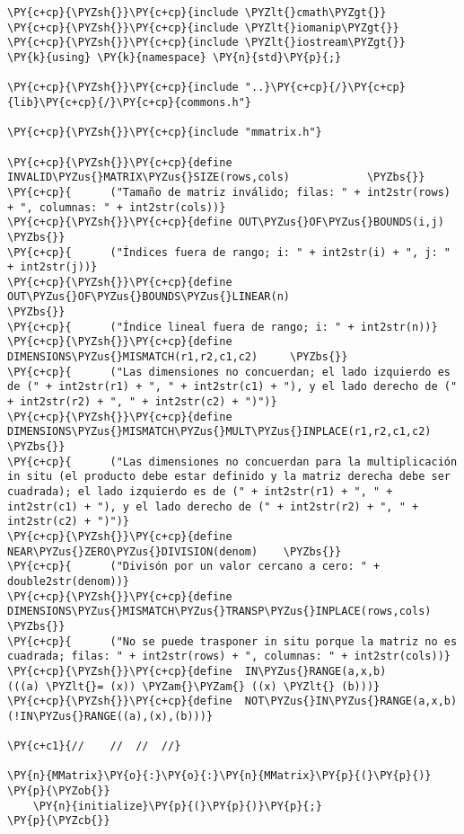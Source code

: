 \begin{Verbatim}[commandchars=\\\{\}]
\PY{c+cp}{\PYZsh{}}\PY{c+cp}{include \PYZlt{}cmath\PYZgt{}}
\PY{c+cp}{\PYZsh{}}\PY{c+cp}{include \PYZlt{}iomanip\PYZgt{}}
\PY{c+cp}{\PYZsh{}}\PY{c+cp}{include \PYZlt{}iostream\PYZgt{}}
\PY{k}{using} \PY{k}{namespace} \PY{n}{std}\PY{p}{;}

\PY{c+cp}{\PYZsh{}}\PY{c+cp}{include "..}\PY{c+cp}{/}\PY{c+cp}{lib}\PY{c+cp}{/}\PY{c+cp}{commons.h"}

\PY{c+cp}{\PYZsh{}}\PY{c+cp}{include "mmatrix.h"}

\PY{c+cp}{\PYZsh{}}\PY{c+cp}{define INVALID\PYZus{}MATRIX\PYZus{}SIZE(rows,cols)			\PYZbs{}}
\PY{c+cp}{		("Tamaño de matriz inválido; filas: " + int2str(rows) + ", columnas: " + int2str(cols))}
\PY{c+cp}{\PYZsh{}}\PY{c+cp}{define OUT\PYZus{}OF\PYZus{}BOUNDS(i,j)						\PYZbs{}}
\PY{c+cp}{		("Índices fuera de rango; i: " + int2str(i) + ", j: " + int2str(j))}
\PY{c+cp}{\PYZsh{}}\PY{c+cp}{define OUT\PYZus{}OF\PYZus{}BOUNDS\PYZus{}LINEAR(n)					\PYZbs{}}
\PY{c+cp}{		("Índice lineal fuera de rango; i: " + int2str(n))}
\PY{c+cp}{\PYZsh{}}\PY{c+cp}{define DIMENSIONS\PYZus{}MISMATCH(r1,r2,c1,c2)		\PYZbs{}}
\PY{c+cp}{		("Las dimensiones no concuerdan; el lado izquierdo es de (" + int2str(r1) + ", " + int2str(c1) + "), y el lado derecho de (" + int2str(r2) + ", " + int2str(c2) + ")")}
\PY{c+cp}{\PYZsh{}}\PY{c+cp}{define	 DIMENSIONS\PYZus{}MISMATCH\PYZus{}MULT\PYZus{}INPLACE(r1,r2,c1,c2)	\PYZbs{}}
\PY{c+cp}{		("Las dimensiones no concuerdan para la multiplicación in situ (el producto debe estar definido y la matriz derecha debe ser cuadrada); el lado izquierdo es de (" + int2str(r1) + ", " + int2str(c1) + "), y el lado derecho de (" + int2str(r2) + ", " + int2str(c2) + ")")}
\PY{c+cp}{\PYZsh{}}\PY{c+cp}{define	 NEAR\PYZus{}ZERO\PYZus{}DIVISION(denom)	\PYZbs{}}
\PY{c+cp}{		("Divisón por un valor cercano a cero: " + double2str(denom))}
\PY{c+cp}{\PYZsh{}}\PY{c+cp}{define	 DIMENSIONS\PYZus{}MISMATCH\PYZus{}TRANSP\PYZus{}INPLACE(rows,cols)	\PYZbs{}}
\PY{c+cp}{		("No se puede trasponer in situ porque la matriz no es cuadrada; filas: " + int2str(rows) + ", columnas: " + int2str(cols))}
\PY{c+cp}{\PYZsh{}}\PY{c+cp}{define	 IN\PYZus{}RANGE(a,x,b)				(((a) \PYZlt{}= (x)) \PYZam{}\PYZam{} ((x) \PYZlt{} (b)))}
\PY{c+cp}{\PYZsh{}}\PY{c+cp}{define	 NOT\PYZus{}IN\PYZus{}RANGE(a,x,b)			(!IN\PYZus{}RANGE((a),(x),(b)))}

\PY{c+c1}{//	//	//	//}

\PY{n}{MMatrix}\PY{o}{:}\PY{o}{:}\PY{n}{MMatrix}\PY{p}{(}\PY{p}{)}
\PY{p}{\PYZob{}}
	\PY{n}{initialize}\PY{p}{(}\PY{p}{)}\PY{p}{;}
\PY{p}{\PYZcb{}}


\end{Verbatim}
